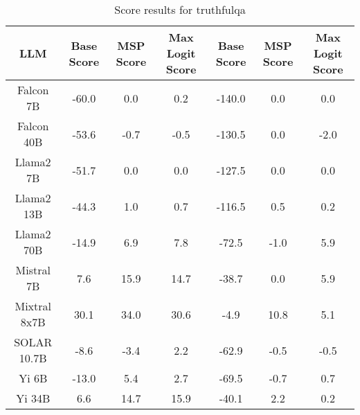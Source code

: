 \renewcommand\arraystretch{1.2}
\begin{table*}
\centering
\begin{tabular}{c|c|c|c|c|c|c}
LLM & Base Score & MSP Score & Max Logit Score & Base Score & MSP Score & Max Logit Score\\ \hline
Falcon 7B & -60.0 & 0.0 & 0.2 & -140.0 & 0.0 & 0.0\\
Falcon 40B & -53.6 & -0.7 & -0.5 & -130.5 & 0.0 & -2.0\\
Llama2 7B & -51.7 & 0.0 & 0.0 & -127.5 & 0.0 & 0.0\\
Llama2 13B & -44.3 & 1.0 & 0.7 & -116.5 & 0.5 & 0.2\\
Llama2 70B & -14.9 & 6.9 & 7.8 & -72.5 & -1.0 & 5.9\\
Mistral 7B & 7.6 & 15.9 & 14.7 & -38.7 & 0.0 & 5.9\\
Mixtral 8x7B & 30.1 & 34.0 & 30.6 & -4.9 & 10.8 & 5.1\\
SOLAR 10.7B & -8.6 & -3.4 & 2.2 & -62.9 & -0.5 & -0.5\\
Yi 6B & -13.0 & 5.4 & 2.7 & -69.5 & -0.7 & 0.7\\
Yi 34B & 6.6 & 14.7 & 15.9 & -40.1 & 2.2 & 0.2\\
\hline
\end{tabular}
\caption{Score results for truthfulqa}
\end{table*}
\label{tab:truthfulqa_score}
